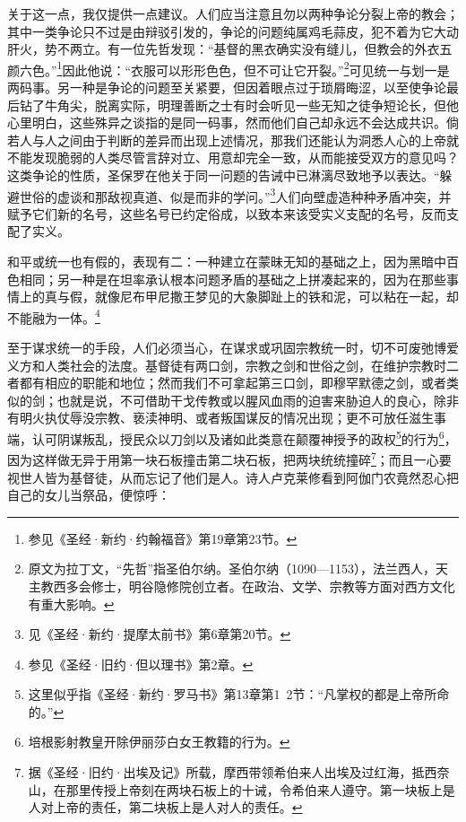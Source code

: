 \par 关于这一点，我仅提供一点建议。人们应当注意且勿以两种争论分裂上帝的教会；其中一类争论只不过是由辩驳引发的，争论的问题纯属鸡毛蒜皮，犯不着为它大动肝火，势不两立。有一位先哲发现：“基督的黑衣确实没有缝儿，但教会的外衣五颜六色。”\footnote{参见《圣经·新约·约翰福音》第19章第23节。}因此他说：“衣服可以形形色色，但不可让它开裂。”\footnote{原文为拉丁文，“先哲”指圣伯尔纳。圣伯尔纳（1090—1153），法兰西人，天主教西多会修士，明谷隐修院创立者。在政治、文学、宗教等方面对西方文化有重大影响。}可见统一与划一是两码事。另一种是争论的问题至关紧要，但因着眼点过于琐屑晦涩，以至使争论最后钻了牛角尖，脱离实际，明理善断之士有时会听见一些无知之徒争短论长，但他心里明白，这些殊异之谈指的是同一码事，然而他们自己却永远不会达成共识。倘若人与人之间由于判断的差异而出现上述情况，那我们还能认为洞悉人心的上帝就不能发现脆弱的人类尽管言辞对立、用意却完全一致，从而能接受双方的意见吗？这类争论的性质，圣保罗在他关于同一问题的告诫中已淋漓尽致地予以表达。“躲避世俗的虚谈和那敌视真道、似是而非的学问。”\footnote{见《圣经·新约·提摩太前书》第6章第20节。}人们向壁虚造种种矛盾冲突，并赋予它们新的名号，这些名号已约定俗成，以致本来该受实义支配的名号，反而支配了实义。
\par 和平或统一也有假的，表现有二：一种建立在蒙昧无知的基础之上，因为黑暗中百色相同；另一种是在坦率承认根本问题矛盾的基础之上拼凑起来的，因为在那些事情上的真与假，就像尼布甲尼撒王梦见的大象脚趾上的铁和泥，可以粘在一起，却不能融为一体。\footnote{参见《圣经·旧约·但以理书》第2章。}
\par 至于谋求统一的手段，人们必须当心，在谋求或巩固宗教统一时，切不可废弛博爱义方和人类社会的法度。基督徒有两口剑，宗教之剑和世俗之剑，在维护宗教时二者都有相应的职能和地位；然而我们不可拿起第三口剑，即穆罕默德之剑，或者类似的剑；也就是说，不可借助干戈传教或以腥风血雨的迫害来胁迫人的良心，除非有明火执仗辱没宗教、亵渎神明、或者叛国谋反的情况出现；更不可放任滋生事端，认可阴谋叛乱，授民众以刀剑以及诸如此类意在颠覆神授予的政权\footnote{这里似乎指《圣经·新约·罗马书》第13章第1~2节：“凡掌权的都是上帝所命的。”}的行为\footnote{培根影射教皇开除伊丽莎白女王教籍的行为。}，因为这样做无异于用第一块石板撞击第二块石板，把两块统统撞碎\footnote{据《圣经·旧约·出埃及记》所载，摩西带领希伯来人出埃及过红海，抵西奈山，在那里传授上帝刻在两块石板上的十诫，令希伯来人遵守。第一块板上是人对上帝的责任，第二块板上是人对人的责任。}；而且一心要视世人皆为基督徒，从而忘记了他们是人。诗人卢克莱修看到阿伽门农竟然忍心把自己的女儿当祭品，便惊呼：
